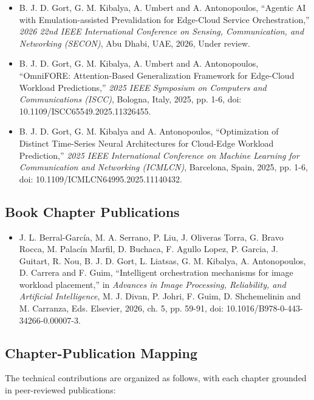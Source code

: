 \begin{itemize}\sloppy
\item[{[C1]}] B. J. D. Gort, G. M. Kibalya, A. Umbert and A. Antonopoulos, ``Agentic AI with Emulation-assisted Prevalidation for Edge-Cloud Service Orchestration,'' \textit{2026 22nd \ac{IEEE} International Conference on Sensing, Communication, and Networking (SECON)}, Abu Dhabi, UAE, 2026, Under review.

\item[{[C2]}] B. J. D. Gort, G. M. Kibalya, A. Umbert and A. Antonopoulos, ``\ac{OmniFORE}: Attention-Based Generalization Framework for Edge-Cloud Workload Predictions,'' \textit{2025 \ac{IEEE} Symposium on Computers and Communications (ISCC)}, Bologna, Italy, 2025, pp. 1-6, doi: 10.1109/ISCC65549.2025.11326455.

\item[{[C3]}] B. J. D. Gort, G. M. Kibalya and A. Antonopoulos, ``Optimization of Distinct Time-Series Neural Architectures for Cloud-Edge Workload Prediction,'' \textit{2025 \ac{IEEE} International Conference on Machine Learning for Communication and Networking (ICMLCN)}, Barcelona, Spain, 2025, pp. 1-6, doi: 10.1109/ICMLCN64995.2025.11140432.
\end{itemize}

\subsection*{Book Chapter Publications}

\begin{itemize}
\item[{[B1]}] J. L. Berral-García, M. A. Serrano, P. Liu, J. Oliveras Torra, G. Bravo Rocca, M. Palacín Marfil, D. Buchaca, F. Agullo Lopez, P. Garcia, J. Guitart, R. Nou, B. J. D. Gort, L. Liatsas, G. M. Kibalya, A. Antonopoulos, D. Carrera and F. Guim, ``Intelligent orchestration mechanisms for image workload placement,'' in \textit{Advances in Image Processing, Reliability, and Artificial Intelligence}, M. J. Divan, P. Johri, F. Guim, D. Shchemelinin and M. Carranza, Eds. Elsevier, 2026, ch. 5, pp. 59-91, doi: 10.1016/B978-0-443-34266-0.00007-3.
\end{itemize}

\subsection*{Chapter-Publication Mapping}

The technical contributions are organized as follows, with each chapter grounded in peer-reviewed publications:

